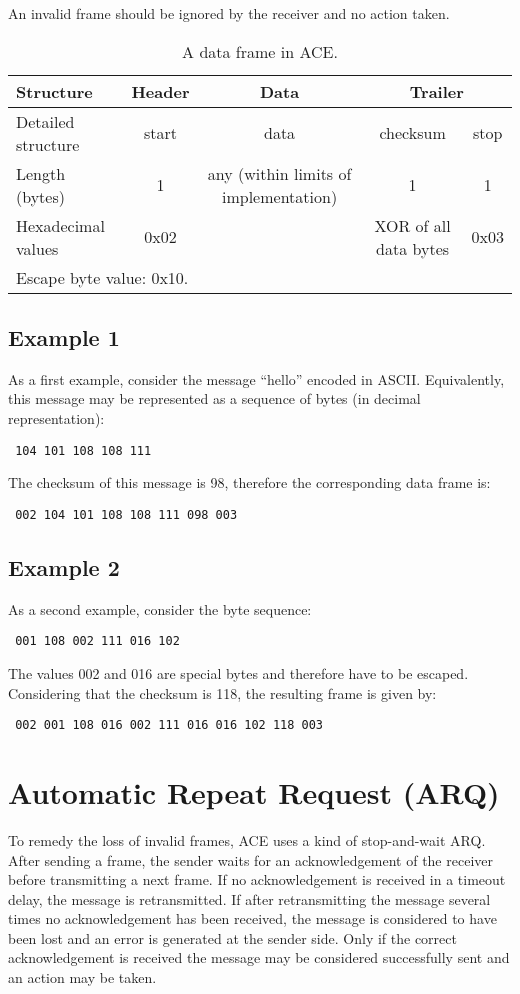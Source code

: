 \documentclass[10pt,a4paper]{article}
\begin{document}
An invalid frame should be ignored by the receiver and no action taken.

\begin{table}[ht]
 \begin{tabular}{|l||c|c|c|c|} \hline
 Structure & Header & Data & \multicolumn{2}{|c|}{Trailer} \\ \hline \hline
 Detailed structure & start & data & checksum & stop \\ \hline
 Length (bytes) & 1 & any (within limits of implementation) & 1 & 1 \\ \hline
 Hexadecimal values & 0x02 & & XOR  of all data bytes & 0x03 \\ \hline
 \multicolumn{5}{l}{Escape byte value: 0x10.} \\
 \end{tabular}
 
 \caption{A data frame in ACE.}
 \label{tab:frame}
\end{table}


\subsection{Example 1}
As a first example, consider the message ``hello'' encoded in ASCII. Equivalently, this message may be represented as a sequence of bytes (in decimal representation): \begin{verbatim} 104 101 108 108 111 \end{verbatim}
The checksum of this message is 98, therefore the corresponding data frame is:
\begin{verbatim} 002 104 101 108 108 111 098 003 \end{verbatim}

\subsection{Example 2}
As a second example, consider the byte sequence:
\begin{verbatim} 001 108 002 111 016 102 \end{verbatim}
The values 002 and 016 are special bytes and therefore have to be escaped. Considering that the checksum is 118, the resulting frame is given by:
\begin{verbatim} 002 001 108 016 002 111 016 016 102 118 003 \end{verbatim}

\section{Automatic Repeat Request (ARQ)}
To remedy the loss of invalid frames, ACE uses a kind of stop-and-wait ARQ. After sending a frame, the sender waits for an acknowledgement of the receiver before transmitting a next frame. If no acknowledgement is received in a timeout delay, the message is retransmitted. If after retransmitting the message several times no acknowledgement has been received, the message is considered to have been lost and an error is generated at the sender side. Only if the correct acknowledgement is received the message may be considered successfully sent and an action may be taken.
\end{document}
